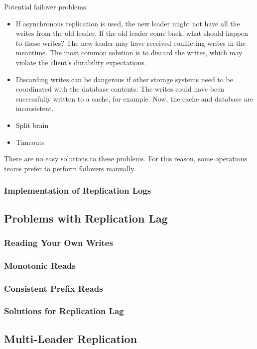 \documentclass[12pt, titlepage]{article}
\begin{document}
Potential failover problems:
\begin{itemize}
	\item If asynchronous replication is used, the new leader might not have all the writes from the old leader. If the old leader come back, what should happen to those writes? The new leader may have received conflicting writes in the meantime. The most common solution is to discard the writes, which may violate the client's durability expectations.
	\item Discarding writes can be dangerous if other storage systems need to be coordinated with the database contents. The writes could have been successfully written to a cache, for example. Now, the cache and database are inconsistent.
	\item Split brain
	\item Timeouts
\end{itemize}

There are no easy solutions to these problems. For this reason, some operations teams prefer to perform failovers manually.

\subsubsection{Implementation of Replication Logs}

\subsection{Problems with Replication Lag}

\subsubsection{Reading Your Own Writes}

\subsubsection{Monotonic Reads}

\subsubsection{Consistent Prefix Reads}

\subsubsection{Solutions for Replication Lag}

\subsection{Multi-Leader Replication}
\end{document}
